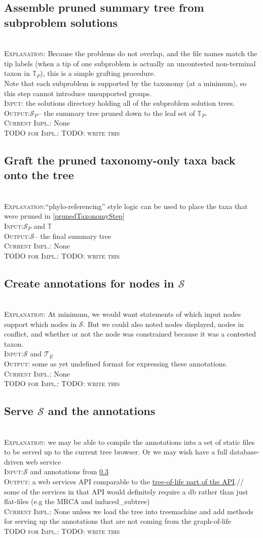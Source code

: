 \documentclass[11pt]{article}
\newcommand{\stepExplanation}[0]{\\\noindent\textsc{Explanation}:\xspace}
\newcommand{\stepInput}[0]{\\\noindent\textsc{Input}:\xspace}
\newcommand{\stepOutput}[0]{\\\noindent\textsc{Output}:\xspace}
\newcommand{\currImpl}[0]{\\\noindent\textsc{Current Impl.}:\xspace}
\newcommand{\implTODO}[0]{\\\noindent\textsc{TODO for Impl.}:\xspace}
\newcommand{\comment}[1]{{\color{red} \textsc{#1}}\xspace}
\newcommand{\TODO}[1]{\comment{TODO: #1}}
\newcommand{\taxonomy}[0]{\ensuremath{\mathbb{T}}\xspace}
\newcommand{\prunedTaxonomy}[0]{\ensuremath{\mathbb{T}_P}\xspace}
\newcommand{\expandedPhylo}[0]{\ensuremath{\mathcal{T}_{E}}\xspace}
\newcommand{\prunedSummary}[0]{\ensuremath{\mathcal{S}_{P}}\xspace}
\newcommand{\summaryTree}[0]{\ensuremath{\mathcal{S}}\xspace}
\begin{document}
\subsection{Assemble pruned summary tree from subproblem solutions}\label{assemblyStep}
\stepExplanation Because the problems do not overlap, and the file names 
    match the tip labels (when a tip of one subproblem is actually an uncontested
    non-terminal taxon in \prunedTaxonomy), this is a simple grafting procedure.\\
    Note that each subproblem is supported by the taxonomy (at a minimum), so this
    step cannot introduce unsupported groups.
\stepInput the solutions directory holding all of the subproblem solution trees.
\stepOutput \prunedSummary -- the summary tree pruned down to the leaf set of \prunedTaxonomy.
\currImpl None
\implTODO \TODO{write this}
 
\subsection{Graft the pruned taxonomy-only taxa back onto the tree}
\stepExplanation ``phylo-referencing'' style logic can be used to place the
    taxa that were pruned in \ref{prunedTaxonomyStep}
\stepInput \prunedSummary and \taxonomy
\stepOutput \summaryTree -- the final summary tree
\currImpl None
\implTODO \TODO{write this}

\subsection{Create annotations for nodes in $\summaryTree$}\label{annotationsStep}
\stepExplanation At minimum, we would want statements of which
    input nodes support which nodes in $\summaryTree$.
    But we could also noted nodes displayed, nodes in conflict, 
    and whether or not the node was constrained because it was a contested taxon.
\stepInput \summaryTree and \expandedPhylo
\stepOutput some as yet undefined format for expressing these annotations.
\currImpl None
\implTODO \TODO{write this}

\subsection{Serve \summaryTree and the annotations}
\stepExplanation we may be able to compile the annotations into a set of
    static files to be served up to the current tree browser.
    Or we may wish have a full database-driven web service
    \stepInput \summaryTree and annotations from \ref{annotationsStep}
\stepOutput a web services API comparable to the
    \href{https://github.com/OpenTreeOfLife/opentree/wiki/Open-Tree-of-Life-APIs#tree-of-life}{tree-of-life part of the API}.//
    some of the services in that API would definitely require a db rather than just flat-files (e.g the MRCA and induced\_subtree)
\currImpl None unless we load the tree into treemachine and add methods for
    serving up the annotations that are not coming from the graph-of-life
\implTODO \TODO{write this}
\end{document}
